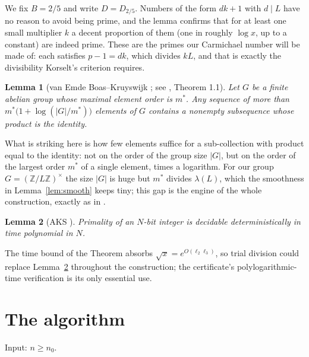 \documentclass[11pt]{amsart}
\newtheorem{lemma}{Lemma}[section]
\newcommand{\Z}{\mathbb{Z}}
\begin{document}
We fix $B = 2/5$ and write $D = D_{2/5}$. Numbers of the form $dk+1$
with $d \mid L$ have no reason to avoid being prime, and the lemma
confirms that for at least one small multiplier $k$ a decent proportion
of them (one in roughly $\log x$, up to a constant) are indeed prime. These are the primes our Carmichael number will be made
of: each satisfies $p - 1 = dk$, which divides $kL$, and that is
exactly the divisibility Korselt's criterion requires.

\begin{lemma}[van Emde Boas--Kruyswijk \cite{EK}; see \cite{AGP}, Theorem 1.1]
\label{lem:vebk}
Let $G$ be a finite abelian group whose maximal element order is $m^*$.
Any sequence of more than $m^*\bigl(1 + \log(|G|/m^*)\bigr)$ elements of
$G$ contains a nonempty subsequence whose product is the identity.
\end{lemma}

What is striking here is how few elements suffice for a sub-collection
with product equal to the identity: not on the order of the group size
$|G|$, but on the order of the largest order $m^*$ of a single element,
times a logarithm. For our group $G = (\Z/L\Z)^\times$ the size $|G|$ is huge
but $m^*$ divides $\lambda(L)$, which the smoothness in
Lemma~\ref{lem:smooth} keeps tiny; this gap is the engine of the whole
construction, exactly as in \cite{AGP}.

\begin{lemma}[AKS \cite{AKS}]
\label{lem:aks}
Primality of an $N$-bit integer is decidable deterministically in time
polynomial in $N$.
\end{lemma}

The time bound of the Theorem absorbs
$\sqrt{x} = e^{O(\ell_2 \ell_3)}$, so trial division could replace
Lemma~\ref{lem:aks} throughout the construction; the certificate's
polylogarithmic-time verification is its only essential use.

\section{The algorithm}
\label{sec:algo}

Input: $n \ge n_0$.
\end{document}
